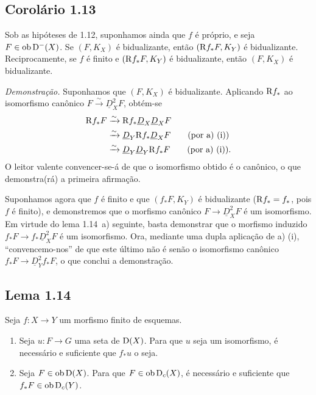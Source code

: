 \subsection*{Corolário 1.13}
Sob as hipóteses de 1.12, suponhamos ainda que $f$ é próprio, e seja $F \in \operatorname{ob} \mathrm{D}^{-}(X)$. Se $(F, K_X)$ é bidualizante, então $(\mathrm{R} f_{*}F, K_Y)$ é bidualizante. Reciprocamente, se $f$ é finito e $(\mathrm{R} f_{*}F, K_Y)$ é bidualizante, então $(F, K_X)$ é bidualizante.

\emph{Demonstração.} Suponhamos que $(F, K_X)$ é bidualizante. Aplicando $\mathrm{R} f_{*}$ ao isomorfismo canônico $F \xrightarrow{\sim} \underline{D}_X^{2} F$, obtém-se
\begin{align*}
\mathrm{R} f_{*} F &\xrightarrow{\sim} \mathrm{R} f_{*} \underline{D}_X \underline{D}_X F \\
&\xrightarrow{\sim} \underline{D}_Y \mathrm{R} f_{*} \underline{D}_X F \qquad \text{(por a) (i))} \\
&\xrightarrow{\sim} \underline{D}_Y \underline{D}_Y \mathrm{R} f_{*} F \qquad \text{(por a) (i)).}
\end{align*}
O leitor valente convencer-se-á de que o isomorfismo obtido é o canônico, o que demonstra(rá) a primeira afirmação.

Suponhamos agora que $f$ é finito e que $(f_{*}F, K_Y)$ é bidualizante ($\mathrm{R} f_{*} = f_{*}$, pois $f$ é finito), e demonstremos que o morfismo canônico $F \to \underline{D}_X^{2} F$ é um isomorfismo. Em virtude do lema 1.14~a) seguinte, basta demonstrar que o morfismo induzido $f_{*}F \to f_{*}\underline{D}_X^{2} F$ é um isomorfismo. Ora, mediante uma dupla aplicação de a) (i), \textquotedblleft convencemo-nos\textquotedblright{} de que este último não é senão o isomorfismo canônico $f_{*}F \to \underline{D}_Y^{2} f_{*}F$, o que conclui a demonstração.

\subsection*{Lema 1.14}
Seja $f : X \to Y$ um morfismo finito de esquemas.
\begin{enumerate}
\item[a)] Seja $u : F \to G$ uma seta de $\mathrm{D}(X)$. Para que $u$ seja um isomorfismo, é necessário e suficiente que $f_{*}u$ o seja.
\item[b)] Seja $F \in \operatorname{ob} \mathrm{D}(X)$. Para que $F \in \operatorname{ob} \mathrm{D}_c(X)$, é necessário e suficiente que $f_{*}F \in \operatorname{ob} \mathrm{D}_c(Y)$.
\end{enumerate}

